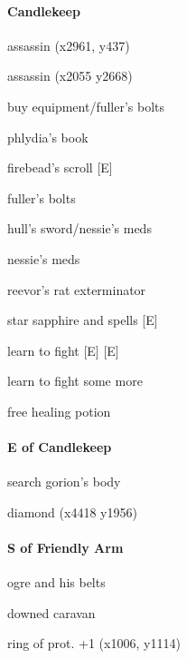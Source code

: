 \documentclass[10pt,a4,twoside]{book}
\begin{document}
\begin{multicols}{3}
\begin{titlepage}


\end{titlepage}
\newpage

\paragraph*{Candlekeep}
\begin{trivlist}
\item assassin (x2961, y437) 
\item assassin (x2055 y2668)
\item buy equipment/fuller's bolts
\item phlydia's book
\item firebead's scroll [E] %
\item fuller's bolts
\item hull's sword/nessie's meds
\item nessie's meds
\item reevor's rat exterminator
\item star sapphire and spells [E] %
\item learn to fight [E] [E]
\item learn to fight some more
\item free healing potion
\end{trivlist}

\paragraph*{E of Candlekeep}
\begin{trivlist}
\item search gorion's body
\item diamond (x4418 y1956)
\end{trivlist}

\paragraph*{S of Friendly Arm}
\begin{trivlist}
\item ogre and his belts  \label{unshey} %
\item downed caravan
\item ring of prot. +1 (x1006, y1114)
\end{trivlist}


\end{multicols}
\end{document}
